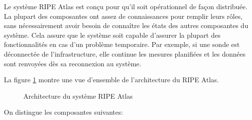 Le système RIPE Atlas est conçu pour qu'il soit opérationnel de façon distribuée. La plupart des composantes ont assez de connaissances pour remplir leurs rôles, sans nécessairement avoir besoin de connaître les états des autres composantes du système. Cela assure que le système soit capable d'assurer la plupart des fonctionnalités en cas  d'un problème temporaire. Par exemple, si une sonde est déconnectée de l'infrastructure, elle continue les mesures planifiées et les données sont renvoyées dès sa reconnexion au système.


La figure  \ref{fig:archi-ripe-atlas} montre une vue d'ensemble de l'architecture du RIPE Atlas.

\begin{figure}[H]
	\centering
	\resizebox{\textwidth}{8 cm}{
		 
	}
	\caption{Architecture du système  RIPE Atlas \cite{WinNT}}
	\label{fig:archi-ripe-atlas}
	
	
\end{figure}
On distingue les composantes suivantes:
